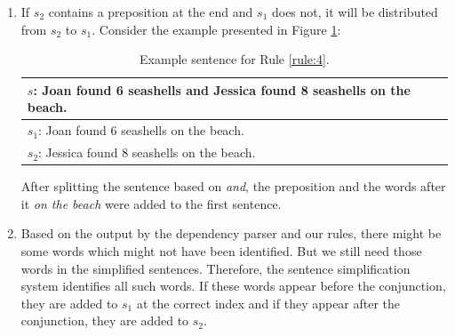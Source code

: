 \documentclass[11pt]{article}
\begin{document}
\begin{enumerate}
\item \label{rule:4}
If \begin{math}s_{2}\end{math} contains a preposition at the end and \begin{math}s_{1}\end{math} does not, it will be distributed from \begin{math}s_{2}\end{math} to \begin{math}s_{1}\end{math}. Consider the example presented in Figure \ref{figure:12}:

\newpage
\begin{table}[h!]
\centering
\begin{tabular}{ | m{25em} | }
\hline
 \textbf{\begin{math}s\end{math}: Joan found 6 seashells and Jessica found 8 seashells on the beach.}\\
\hline
\begin{math}s_{1}\end{math}: Joan found 6 seashells on the beach.\\
\hline
\begin{math}s_{2}\end{math}: Jessica found 8 seashells on the beach.\\
\hline
\end{tabular}
\caption{Example sentence for Rule  \ref{rule:4}.}
\label{figure:12}
\end{table}

After splitting the sentence based on \textit{and}, the preposition and the words after it \textit{on the beach} were added to the first sentence.

\item
Based on the output by the dependency parser and our rules, there might be some words which might not have been identified. But we still need those words in the simplified sentences. Therefore, the sentence simplification system identifies all such words. If these words appear before the conjunction, they are added to \begin{math}s_{1}\end{math} at the correct index and if they appear after the conjunction, they are added to \begin{math}s_{2}\end{math}.

\end{enumerate}
\end{document}
